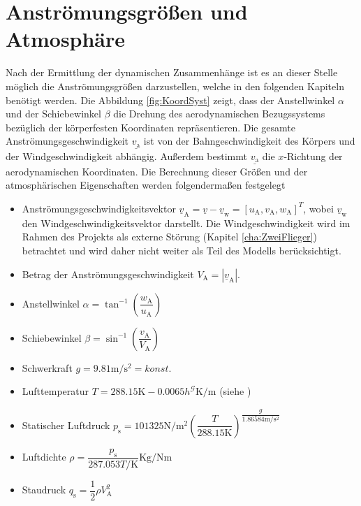 \section{Anströmungsgrößen und Atmosphäre}
\label{sec:atmospäre}
Nach der Ermittlung der dynamischen Zusammenhänge ist es an dieser Stelle möglich die Anströmungsgrö{\ss}en darzustellen, welche in den folgenden Kapiteln benötigt werden. Die Abbildung \ref{fig:KoordSyst} zeigt, dass der Anstellwinkel $\alpha$ und der Schiebewinkel $\beta$ die Drehung des aerodynamischen Bezugssystems bezüglich der körperfesten Koordinaten repräsentieren. Die gesamte Anströmungsgeschwindigkeit $\underline{v_\mathrm{a}}$ ist von der Bahngeschwindigkeit des Körpers und der Windgeschwindigkeit abhängig. Au{\ss}erdem bestimmt $\underline{v_\mathrm{a}}$ die $x$-Richtung der aerodynamischen Koordinaten. Die Berechnung dieser Grö{\ss}en und der atmosphärischen Eigenschaften werden folgenderma{\ss}en festgelegt
\begin{itemize}
\item Anströmungsgeschwindigkeitsvektor $\underline{v}_\mathrm{A} = \underline{v}- \underline{v}_\mathrm{w}  = [u_\mathrm{A},v_\mathrm{A},w_\mathrm{A}]^T $, wobei $\underline{v}_\mathrm{w}$ den Windgeschwindigkeitsvektor darstellt. Die Windgeschwindigkeit wird im Rahmen des Projekts als externe Störung (Kapitel \ref{cha:ZweiFlieger}) betrachtet  und wird daher nicht weiter als Teil des Modells berücksichtigt.  
\item Betrag der Anströmungsgeschwindigkeit $V_\mathrm{A} = |\underline{v}_\mathrm{A}| $.
\item Anstellwinkel $\alpha = \tan^{-1}\left(\dfrac{w_\mathrm{A}}{u_\mathrm{A}}\right)$
\item Schiebewinkel $\beta = \sin^{-1}\left(\dfrac{v_\mathrm{A}}{V_\mathrm{A}}\right)$
\item Schwerkraft $g = 9.81 \mathrm{m/s^2} = konst.$
\item Lufttemperatur $ T = 288.15 \mathrm{K} - 0.0065h^\mathcal{G}\mathrm{K/m}$ (siehe \cite{AircraftCS})
\item Statischer Luftdruck $p_\mathrm{s} = 101325\mathrm{N/m^2}\left(\dfrac{T}{288.15  \mathrm{K}}\right)^{\dfrac{g}{1.86584 \mathrm{m/s^2}}}$
\item Luftdichte $\rho = \dfrac{p_\mathrm{s}}{287.053T/\mathrm{K}} \mathrm{Kg/Nm}$
\item Staudruck $q_\mathrm{s} = \dfrac{1}{2}\rho V_\mathrm{A}^2$

\end{itemize}
